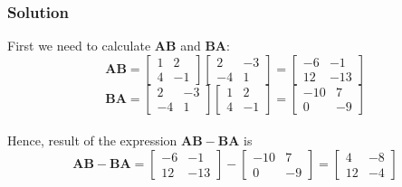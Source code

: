 \documentclass{article}
\begin{document}
            \subsubsection{Solution}
                First we need to calculate $\mathbf{AB}$ and $\mathbf{BA}$:
                \begin{equation*}
                    \mathbf{AB} =
                    \begin{bmatrix}1 & 2 \\ 4 & -1\end{bmatrix}
                    \begin{bmatrix}2 & -3 \\ -4 & 1\end{bmatrix}
                    =
                    \begin{bmatrix}-6 & -1 \\ 12 & -13\end{bmatrix}
                \end{equation*}
                \begin{equation*}
                    \mathbf{BA} =
                    \begin{bmatrix}2 & -3 \\ -4 & 1\end{bmatrix}
                    \begin{bmatrix}1 & 2 \\ 4 & -1\end{bmatrix}
                    =
                    \begin{bmatrix}-10 & 7 \\ 0 & -9\end{bmatrix}
                \end{equation*}
                \\
                Hence, result of the expression $\mathbf{AB - BA}$ is
                \begin{equation*}
                    \mathbf{AB - BA} =
                    \begin{bmatrix}-6 & -1 \\ 12 & -13\end{bmatrix}
                    -
                    \begin{bmatrix}-10 & 7 \\ 0 & -9\end{bmatrix}
                    =
                    \begin{bmatrix}4 & -8 \\ 12 & -4\end{bmatrix}
                \end{equation*}
\end{document}
